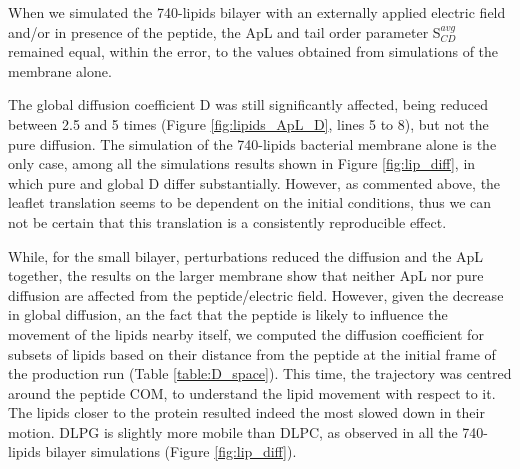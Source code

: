 When we simulated the 740-lipids bilayer with an externally applied electric field and/or in presence of the peptide, the ApL and tail order parameter S$^{avg}_{CD}$ remained equal, within the error, to the values obtained from simulations of the membrane alone.

The global diffusion coefficient D was still significantly affected, being reduced between 2.5 and 5 times (Figure \ref{fig:lipids_ApL_D}, lines 5 to 8), but not the pure diffusion. The simulation of the 740-lipids bacterial membrane alone is the only case, among all the simulations results shown in Figure \ref{fig:lip_diff}, in which pure and global D differ substantially. However, as commented above, the leaflet translation seems to be dependent on the initial conditions, thus we can not be certain that this translation is a consistently reproducible effect.

While, for the small bilayer, perturbations reduced the diffusion and the ApL together, the results on the larger membrane show that neither ApL nor pure diffusion are affected from the peptide/electric field.
%
However, given the decrease in global diffusion, an the fact that the peptide is likely to influence the movement of the lipids nearby itself, we computed the diffusion coefficient for subsets of lipids based on their distance from the peptide at the initial frame of the production run (Table \ref{table:D_space}). This time, the trajectory was centred around the peptide COM, to understand the lipid movement with respect to it. The lipids closer to the protein resulted indeed the most slowed down in their motion. DLPG is slightly more mobile than DLPC, as observed in all the 740-lipids bilayer simulations (Figure \ref{fig:lip_diff}).

